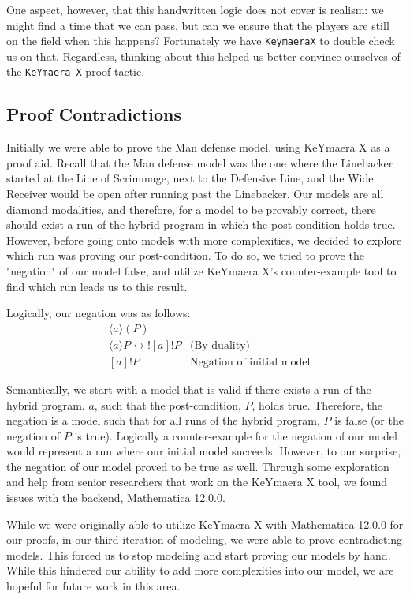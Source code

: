 One aspect, however, that this handwritten logic does not cover is realism: we might find a time that we can pass, but can we ensure that the players are still on the field when this happens? Fortunately we have \texttt{KeymaeraX} to double check us on that. Regardless, thinking about this helped us better convince ourselves of the \texttt{KeYmaera X} proof tactic. 

\subsection{Proof Contradictions}
\quad Initially we were able to prove the Man defense model, using KeYmaera X as a proof aid. Recall that the Man defense model was the one where the Linebacker started at the Line of Scrimmage, next to the Defensive Line, and the Wide Receiver would be open after running past the Linebacker. Our models are all diamond modalities, and therefore, for a model to be provably correct, there should exist a run of the hybrid program in which the post-condition holds true. However, before going onto models with more complexities, we decided to explore which run was proving our post-condition. To do so, we tried to prove the "negation" of our model false, and utilize KeYmaera X's counter-example tool to find which run leads us to this result. \

Logically, our negation was as follows:
\begin{align*}
    & \langle a \rangle (P) \\
    &\langle a \rangle P \leftrightarrow ![a]!P & \text{(By duality)}\\
    & [a]!P & \text{Negation of initial model}
\end{align*}

Semantically, we start with a model that is valid if there exists a run of the hybrid program. $a$, such that the post-condition, $P$, holds true. Therefore, the negation is a model such that for all runs of the hybrid program, $P$ is false (or the negation of $P$ is true). Logically a counter-example for the negation of our model would represent a run where our initial model succeeds. However, to our surprise, the negation of our model proved to be true as well. Through some exploration and help from senior researchers that work on the KeYmaera X tool, we found issues with the backend, Mathematica 12.0.0. \\

\newpage

While we were originally able to utilize KeYmaera X with Mathematica 12.0.0 for our proofs, in our third iteration of modeling, we were able to prove contradicting models. This forced us to stop modeling and start proving our models by hand. While this hindered our ability to add more complexities into our model, we are hopeful for future work in this area. 